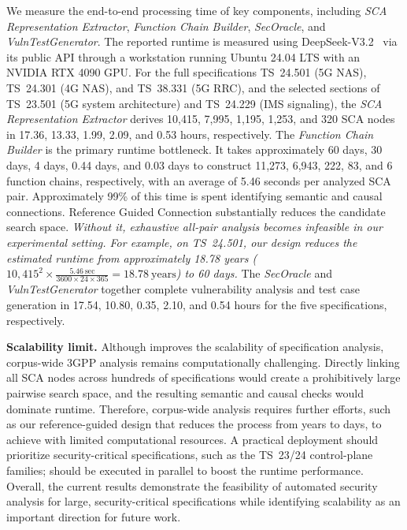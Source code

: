We measure the end-to-end processing time of key components, including \textit{SCA Representation Extractor}, \textit{Function Chain Builder}, \textit{SecOracle}, and \textit{VulnTestGenerator}. The reported runtime is measured using DeepSeek-V3.2~\cite{deepseek_v32_release_2025} via its public API through a workstation running Ubuntu 24.04 LTS with an NVIDIA RTX 4090 GPU.   
For the full specifications TS~24.501 (5G NAS), TS~24.301 (4G NAS), and TS~38.331 (5G RRC), and the selected sections of TS~23.501 (5G system architecture) and TS~24.229 (IMS signaling), the \textit{SCA Representation Extractor} derives 10,415, 7,995, 1,195, 1,253, and 320 SCA nodes in 17.36, 13.33, 1.99, 2.09, and 0.53 hours, respectively. The \textit{Function Chain Builder} is the primary runtime bottleneck. 
It takes approximately 60 days, 30 days, 4 days, 0.44 days, and 0.03 days to construct 11,273, 6,943, 222, 83, and 6 function chains, respectively, with an average of 5.46 seconds per analyzed SCA pair. Approximately 99\% of this time is spent identifying semantic and causal connections. Reference Guided Connection substantially reduces the candidate search space. \textit{Without it, exhaustive all-pair analysis becomes infeasible in our experimental setting. For example, on TS~24.501, our design reduces the estimated runtime from approximately 18.78 years ($10,415^2 \times \frac{5.46~\text{sec}}{3600 \times 24 \times 365} = 18.78 ~\text{years}$) to 60 days.} The \textit{SecOracle} and \textit{VulnTestGenerator} together complete vulnerability analysis and test case generation in 17.54, 10.80, 0.35, 2.10, and 0.54 hours for the five specifications, respectively. 

\noindent\textbf{Scalability limit.}
Although \lm improves the scalability of specification analysis, corpus-wide 3GPP analysis remains computationally challenging. Directly linking all SCA nodes across hundreds of specifications would create a prohibitively large pairwise search space, and the resulting semantic and causal checks would dominate runtime. Therefore, corpus-wide analysis requires further efforts, such as our reference-guided design that reduces the process from years to days, to achieve with limited computational resources. A practical deployment should prioritize security-critical specifications, such as the TS~23/24 control-plane families; \lm should be executed in parallel to boost the runtime performance. Overall, the current results demonstrate the feasibility of automated security analysis for large, security-critical specifications while identifying scalability as an important direction for future work.  


 





